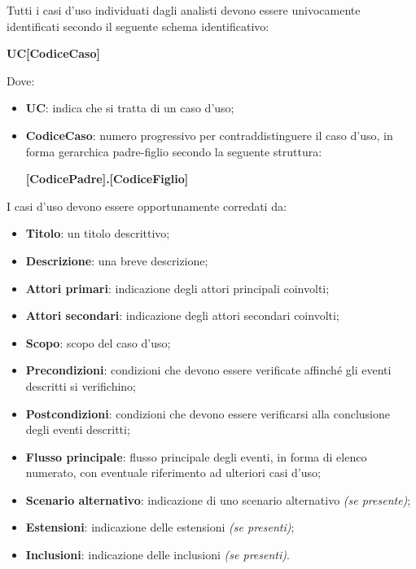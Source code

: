 Tutti i casi d'uso individuati dagli analisti devono essere univocamente identificati secondo il seguente schema identificativo:

\begin{center}
    \textbf{UC[CodiceCaso]}
\end{center}

Dove:

\begin{itemize}
    \item \textbf{UC}: indica che si tratta di un caso d'uso;
    \item \textbf{CodiceCaso}: numero progressivo per contraddistinguere il caso d'uso, in forma gerarchica padre-figlio secondo la seguente struttura:
    \begin{center}
        \textbf{[CodicePadre].[CodiceFiglio]}
    \end{center}
\end{itemize}

I casi d'uso devono essere opportunamente corredati da:

\begin{itemize}
    \item \textbf{Titolo}: un titolo descrittivo;
    \item \textbf{Descrizione}: una breve descrizione;
    \item \textbf{Attori primari}: indicazione degli attori principali coinvolti;
    \item \textbf{Attori secondari}: indicazione degli attori secondari coinvolti;
    \item \textbf{Scopo}: scopo del caso d'uso;
    \item \textbf{Precondizioni}: condizioni che devono essere verificate affinch\'{e} gli eventi descritti si verifichino;
    \item \textbf{Postcondizioni}: condizioni che devono essere verificarsi alla conclusione degli eventi descritti; 
    \item \textbf{Flusso principale}: flusso principale degli eventi, in forma di elenco numerato, con eventuale riferimento ad ulteriori casi d'uso;
    \item \textbf{Scenario alternativo}: indicazione di uno scenario alternativo \emph{(se presente)};
    \item \textbf{Estensioni}: indicazione delle estensioni \emph{(se presenti)};
    \item \textbf{Inclusioni}: indicazione delle inclusioni \emph{(se presenti)}.
\end{itemize}